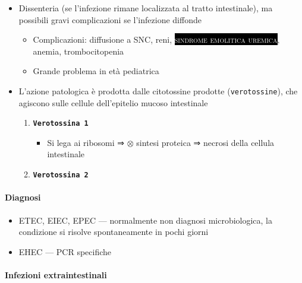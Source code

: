 \documentclass[italian,]{article}
\providecommand{\tightlist}{%
  \setlength{\itemsep}{0pt}\setlength{\parskip}{0pt}}
\newcommand{\pat}[1]{\colorbox{black}{\textcolor{white}{\textsc{#1}}}}
\newcommand{\ini}[0]{ $\otimes$ }                                       %
\begin{document}
\begin{itemize}
\tightlist
\item
  Dissenteria (se l'infezione rimane localizzata al tratto intestinale),
  ma possibili gravi complicazioni se l'infezione diffonde

  \begin{itemize}
  \tightlist
  \item
    Complicazioni: diffusione a SNC, reni,
    \pat{sindrome emolitica uremica}, anemia, trombocitopenia
  \item
    Grande problema in età pediatrica
  \end{itemize}
\item
  L'azione patologica è prodotta dalle citotossine prodotte
  (\texttt{verotossine}), che agiscono sulle cellule dell'epitelio
  mucoso intestinale

  \begin{enumerate}
  \def\labelenumi{\arabic{enumi}.}
  \tightlist
  \item
    \textbf{\texttt{Verotossina\ 1}}

    \begin{itemize}
    \tightlist
    \item
      Si lega ai ribosomi ⇒ \ini sintesi proteica ⇒ necrosi della
      cellula intestinale
    \end{itemize}
  \item
    \textbf{\texttt{Verotossina\ 2}}
  \end{enumerate}
\end{itemize}

\hypertarget{diagnosi-5}{%
\paragraph{Diagnosi}\label{diagnosi-5}}

\begin{itemize}
\tightlist
\item
  ETEC, EIEC, EPEC --- normalmente non diagnosi microbiologica, la
  condizione si risolve spontaneamente in pochi giorni
\item
  EHEC --- PCR specifiche
\end{itemize}

\hypertarget{infezioni-extraintestinali}{%
\paragraph{Infezioni
extraintestinali}\label{infezioni-extraintestinali}}
\end{document}
